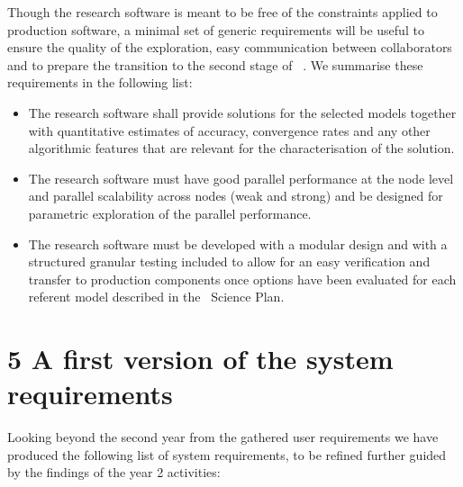 \documentclass{article}
\begin{document}
Though the research software is meant to be free of the constraints applied to 
production software, a minimal set of generic requirements will be useful to ensure 
the quality of the exploration, easy communication between collaborators and to 
prepare the transition to the second stage of \nep \  . We summarise these requirements 
in the following list:

\begin{itemize}
\item The research software shall provide solutions for the selected models together 
with quantitative estimates of accuracy, convergence rates and any other algorithmic 
features that are relevant for the characterisation of the solution.

\item The research software must have good parallel performance at the node level 
and parallel scalability across nodes (weak and strong) and be designed for parametric 
exploration of the parallel performance.

\item The research software must be developed with a modular design and with a structured 
granular testing included to allow for an easy verification and transfer to production 
components once options have been evaluated for each referent model described in 
the \nep \   Science Plan. 
\end{itemize}

\section*{{\Large{}{ \textbf{5 A first version of the system requirements}}}}

Looking beyond the second year from the gathered user requirements we have produced 
the following list of system requirements, to be refined further guided by the 
findings of the year 2 activities:
\end{document}

